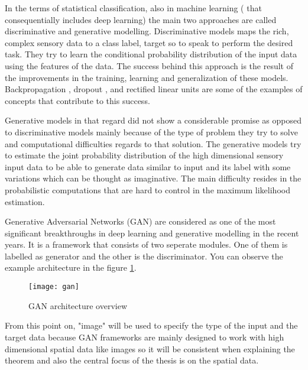 In the terms of statistical classification, also in machine learning ( that consequentially includes
deep learning) the main two approaches are called discriminative and generative modelling.
Discriminative models maps the rich, complex sensory data to a class label, target so to speak to
perform the desired task. They try to learn the conditional probability distribution of the input
data using the features of the data. The success behind this approach is the result of the
improvements in the training, learning and generalization of these models. Backpropagation
\cite{Widrow2008AppendixGT}, dropout \cite{Srivastava2014DropoutAS}, and rectified linear
units\cite{Glorot2011DeepSR} are some of the examples of concepts that contribute to this success.

Generative models in that regard did not show a considerable promise as opposed to discriminative
models mainly because of the type of problem they try to solve and computational difficulties
regards to that solution. The generative models try to estimate the joint probability distribution
of the high dimensional sensory input data to be able to generate data similar to input and its
label with some variations which can be thought as imaginative. The main difficulty resides in
the probabilistic computations that are hard to control in the maximum likelihood estimation.
\cite{Goodfellow:2014:GAN:2969033.2969125} \cite{pmlr-v5-salakhutdinov09a}

Generative Adversarial Networks (GAN) are considered as one of the most significant breakthroughs in
deep learning and generative modelling in the recent years. It is a framework that consists of two
seperate modules. One of them is labelled as generator and the other is the discriminator. You can
observe the example architecture in the figure \ref{fig:gan_network}. 

\begin{figure}[h!]
	\centering
	\texttt{[image: gan]}
    \caption{GAN architecture overview}
    \label{fig:gan_network}
\end{figure}

From this point on, "image" will be used to specify the type of the input and the target data because
GAN frameworks are mainly designed to work with high dimensional spatial data like images so it will
be consistent when explaining the theorem and also the central focus of the thesis is on the spatial
data. 

